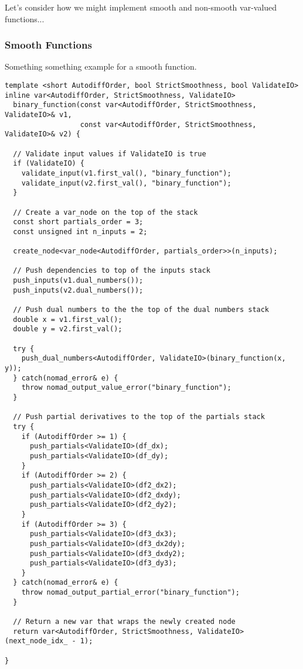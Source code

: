 Let's consider how we might implement smooth and non-smooth
var-valued functions...

\subsubsection{Smooth Functions}

Something something example for a smooth function.

\begin{verbatim}
template <short AutodiffOrder, bool StrictSmoothness, bool ValidateIO>
inline var<AutodiffOrder, StrictSmoothness, ValidateIO>
  binary_function(const var<AutodiffOrder, StrictSmoothness, ValidateIO>& v1,
                  const var<AutodiffOrder, StrictSmoothness, ValidateIO>& v2) {
    
  // Validate input values if ValidateIO is true
  if (ValidateIO) {
    validate_input(v1.first_val(), "binary_function");
    validate_input(v2.first_val(), "binary_function");
  }
      
  // Create a var_node on the top of the stack
  const short partials_order = 3;
  const unsigned int n_inputs = 2;
    
  create_node<var_node<AutodiffOrder, partials_order>>(n_inputs);

  // Push dependencies to top of the inputs stack
  push_inputs(v1.dual_numbers());
  push_inputs(v2.dual_numbers());

  // Push dual numbers to the the top of the dual numbers stack
  double x = v1.first_val();
  double y = v2.first_val();
    
  try {
    push_dual_numbers<AutodiffOrder, ValidateIO>(binary_function(x, y));
  } catch(nomad_error& e) {
    throw nomad_output_value_error("binary_function");
  }
    
  // Push partial derivatives to the top of the partials stack
  try {
    if (AutodiffOrder >= 1) {
      push_partials<ValidateIO>(df_dx);
      push_partials<ValidateIO>(df_dy);
    }
    if (AutodiffOrder >= 2) {
      push_partials<ValidateIO>(df2_dx2);
      push_partials<ValidateIO>(df2_dxdy);
      push_partials<ValidateIO>(df2_dy2);
    }
    if (AutodiffOrder >= 3) {
      push_partials<ValidateIO>(df3_dx3);
      push_partials<ValidateIO>(df3_dx2dy);
      push_partials<ValidateIO>(df3_dxdy2);
      push_partials<ValidateIO>(df3_dy3);
    }
  } catch(nomad_error& e) {
    throw nomad_output_partial_error("binary_function");
  }

  // Return a new var that wraps the newly created node
  return var<AutodiffOrder, StrictSmoothness, ValidateIO>(next_node_idx_ - 1);
    
}
\end{verbatim}

